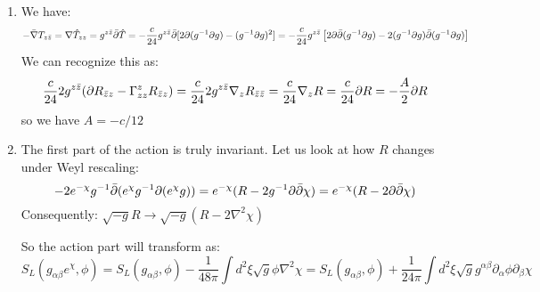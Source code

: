 \documentclass[11pt]{article}
\begin{document}
\begin{enumerate}
	\item We have:
	\[
		- \bar \nabla T_{z \bar z} = \nabla \hat T_{zz} = g^{z \bar z} \bar \partial \hat T = - \frac{c}{24} g^{z \bar z} \bar {\partial} [2 \partial(g^{-1} \partial g) - (g^{-1} \partial g)^2] = -\frac{c}{24} g^{z \bar z} \left[2\partial \bar {\partial}(g^{-1} \partial g) - 2 (g^{-1} \partial g) \bar {\partial} (g^{-1} \partial g)\right]
	\]
	We can recognize this as:
	\[
		\frac{c}{24} 2 g^{z \bar z} (\partial R_{\bar z z} - \Gamma^z_{z z} R_{\bar z z}) = \frac{c}{24} 2 g^{z \bar z} \nabla_z R_{\bar z \bar z} = \frac{c}{24} \nabla_z R = \frac{c}{24} \partial R  = - \frac{A}{2} \partial R
	\]
	so we have $A = - c/12$
	\item The first part of the action is truly invariant. Let us look at how $R$ changes under Weyl rescaling:
	\[
		-2 e^{-\chi} g^{-1} \bar {\partial}(e^{\chi} g^{-1} \partial (e^{\chi} g)) = e^{-\chi} (R - 2 g^{-1} \partial \bar \partial \chi) = e^{-\chi} (R - 2 \partial \bar \partial \chi)
	\]
	Consequently: $\sqrt{-g} R \to \sqrt{-g} (R - 2 \nabla^2 \chi)$
	
	So the action part will transform as:
	\[
		S_L(g_{\alpha \beta} e^{\chi}, \phi) = S_L(g_{\alpha \beta}, \phi) - \frac{1}{48\pi} \int d^2 \xi \sqrt{g} \phi \nabla^2 \chi = S_L(g_{\alpha \beta}, \phi) + \frac{1}{24\pi} \int d^2 \xi \sqrt{g} g^{\alpha \beta} \partial_{\alpha} \phi \partial_\beta \chi
	\]
	

\end{enumerate}
\end{document}
